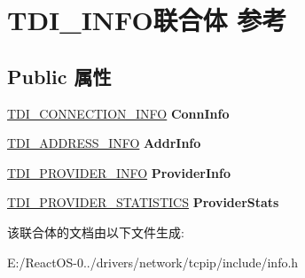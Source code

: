 \hypertarget{union_t_d_i___i_n_f_o}{}\section{T\+D\+I\+\_\+\+I\+N\+F\+O联合体 参考}
\label{union_t_d_i___i_n_f_o}
\subsection*{Public 属性}
\begin{DoxyCompactItemize}
\item 
\mbox{\label{union_t_d_i___i_n_f_o_ace1feaf39fe44d77b6e62ba60fd2d023}} 
\hyperlink{struct___t_d_i___c_o_n_n_e_c_t_i_o_n___i_n_f_o}{T\+D\+I\+\_\+\+C\+O\+N\+N\+E\+C\+T\+I\+O\+N\+\_\+\+I\+N\+FO} {\bfseries Conn\+Info}
\item 
\mbox{\label{union_t_d_i___i_n_f_o_af3da2df255be7e83182104986918ce00}} 
\hyperlink{struct___t_d_i___a_d_d_r_e_s_s___i_n_f_o}{T\+D\+I\+\_\+\+A\+D\+D\+R\+E\+S\+S\+\_\+\+I\+N\+FO} {\bfseries Addr\+Info}
\item 
\mbox{\label{union_t_d_i___i_n_f_o_ad208ac1d552f361ad65b06616765e988}} 
\hyperlink{struct___t_d_i___p_r_o_v_i_d_e_r___i_n_f_o}{T\+D\+I\+\_\+\+P\+R\+O\+V\+I\+D\+E\+R\+\_\+\+I\+N\+FO} {\bfseries Provider\+Info}
\item 
\mbox{\label{union_t_d_i___i_n_f_o_a896c041babba0a32adef6762caa759b5}} 
\hyperlink{struct___t_d_i___p_r_o_v_i_d_e_r___s_t_a_t_i_s_t_i_c_s}{T\+D\+I\+\_\+\+P\+R\+O\+V\+I\+D\+E\+R\+\_\+\+S\+T\+A\+T\+I\+S\+T\+I\+CS} {\bfseries Provider\+Stats}
\end{DoxyCompactItemize}


该联合体的文档由以下文件生成\+:\begin{DoxyCompactItemize}
\item 
E\+:/\+React\+O\+S-\/0../drivers/network/tcpip/include/info.\+h\end{DoxyCompactItemize}
